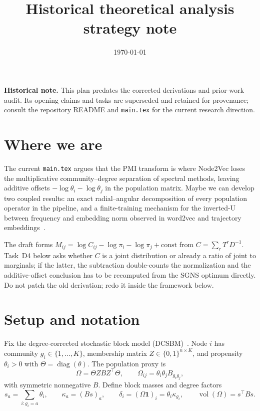 \documentclass[11pt]{article}
\title{Historical theoretical analysis strategy note}
\author{}
\date{\today}
\newcommand{\ones}{\mathbf{1}}
\DeclareMathOperator{\vol}{vol}
\DeclareMathOperator{\diag}{diag}
\begin{document}
\maketitle

\noindent\textbf{Historical note.}
This plan predates the corrected derivations and prior-work audit.
Its opening claims and tasks are superseded and retained for provenance; consult the repository README and \texttt{main.tex} for the current research direction.

\section{Where we are}

The current \texttt{main.tex} argues that the PMI transform is where Node2Vec loses the multiplicative community--degree separation of spectral methods, leaving additive offsets \(-\log\theta_i-\log\theta_j\) in the population matrix.
Maybe we can develop two coupled results: an exact radial--angular decomposition of every population operator in the pipeline, and a finite-training mechanism for the inverted-U between frequency and embedding norm observed in word2vec and trajectory embeddings~\citep{schakel2015,murray2023}.

The draft forms \(M_{ij}=\log C_{ij}-\log\pi_i-\log\pi_j+\text{const}\) from \(C=\sum_r T^r D^{-1}\).
Task~D4 below asks whether \(C\) is a joint distribution or already a ratio of joint to marginals; if the latter, the subtraction double-counts the normalization and the additive-offset conclusion has to be recomputed from the SGNS optimum directly.
Do not patch the old derivation; redo it inside the framework below.

\section{Setup and notation}

Fix the degree-corrected stochastic block model (DCSBM)~\citep{karrer2011stochastic}.
Node \(i\) has community \(g_i\in\{1,\dots,K\}\), membership matrix \(Z\in\{0,1\}^{n\times K}\), and propensity \(\theta_i>0\) with \(\Theta=\diag(\theta)\).
The population proxy is
\begin{equation}
    \Omega=\Theta ZBZ^\top\Theta,
    \qquad
    \Omega_{ij}=\theta_i\theta_j B_{g_i g_j},
    \label{eq:omega}
\end{equation}
with symmetric nonnegative \(B\).
Define block masses and degree factors
\begin{equation}
    s_a=\sum_{i:g_i=a}\theta_i,
    \qquad
    \kappa_a=(Bs)_a,
    \qquad
    \delta_i=(\Omega\ones)_i=\theta_i\kappa_{g_i},
    \qquad
    \vol(\Omega)=s^\top Bs.
    \label{eq:block-masses}
\end{equation}
\end{document}
